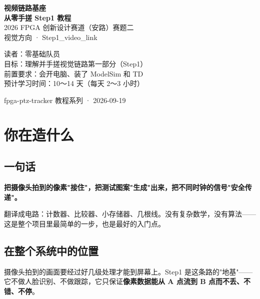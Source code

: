\documentclass[11pt]{ctexart}
\begin{document}
\begin{titlepage}
\centering
\vspace*{2.5cm}
{\color{deep}\Huge\bfseries 视频链路基座}\\[6pt]
{\color{deep}\Large\bfseries 从零手搓 Step1 教程}\\[14pt]
{\large 2026 FPGA 创新设计赛道（安路）赛题二}\\[6pt]
{\large 视觉方向 · Step1\_video\_link}\\[20pt]

\begin{tcolorbox}[enhanced, colback=boxbg, colframe=accent, boxrule=0.8pt,
  arc=2mm, width=12cm, left=4mm, right=4mm, top=3mm, bottom=3mm]
\centering
{\small 读者：零基础队员\\
目标：理解并手搓视觉链路第一部分（Step1）\\
前置要求：会开电脑、装了 ModelSim 和 TD\\
预计学习时间：10～14 天（每天 2～3 小时）}
\end{tcolorbox}

\vfill
{\small\color{black!50} fpga-ptz-tracker 教程系列 · 2026-09-19}
\end{titlepage}

\tableofcontents
\newpage

\section{你在造什么}

\subsection{一句话}

\textbf{把摄像头拍到的像素"接住"，把测试图案"生成"出来，把不同时钟的信号"安全传递"。}

翻译成电路：计数器、比较器、小存储器、几根线。没有复杂数学，没有算法——这是整个项目里最简单的一步，也是最好的入门点。

\subsection{在整个系统中的位置}

摄像头拍到的画面要经过好几级处理才能到屏幕上。Step1 是这条路的"地基"——它不做人脸识别、不做跟踪，它只保证\textbf{像素数据能从 A 点流到 B 点而不丢、不错、不停}。
\end{document}
